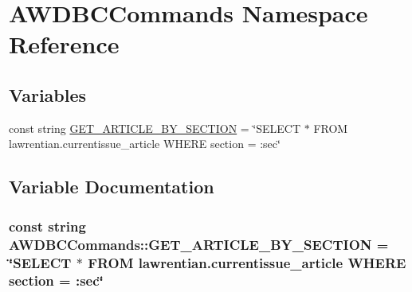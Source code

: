 \hypertarget{namespace_a_w_d_b_c_commands}{}\section{A\+W\+D\+B\+C\+Commands Namespace Reference}
\label{namespace_a_w_d_b_c_commands}
\subsection*{Variables}
\begin{DoxyCompactItemize}
\item 
const string \hyperlink{namespace_a_w_d_b_c_commands_a9ef470fbea57863df7dc89da244e8050}{G\+E\+T\+\_\+\+A\+R\+T\+I\+C\+L\+E\+\_\+\+B\+Y\+\_\+\+S\+E\+C\+T\+I\+O\+N} = \char`\"{}S\+E\+L\+E\+C\+T $\ast$ F\+R\+O\+M lawrentian.\+currentissue\+\_\+article W\+H\+E\+R\+E section = \+:sec\char`\"{}
\end{DoxyCompactItemize}


\subsection{Variable Documentation}
\hypertarget{namespace_a_w_d_b_c_commands_a9ef470fbea57863df7dc89da244e8050}{}
\subsubsection[{G\+E\+T\+\_\+\+A\+R\+T\+I\+C\+L\+E\+\_\+\+B\+Y\+\_\+\+S\+E\+C\+T\+I\+O\+N}]{\setlength{\rightskip}{0pt plus 5cm}const string A\+W\+D\+B\+C\+Commands\+::\+G\+E\+T\+\_\+\+A\+R\+T\+I\+C\+L\+E\+\_\+\+B\+Y\+\_\+\+S\+E\+C\+T\+I\+O\+N = \char`\"{}S\+E\+L\+E\+C\+T $\ast$ F\+R\+O\+M lawrentian.\+currentissue\+\_\+article W\+H\+E\+R\+E section = \+:sec\char`\"{}}\label{namespace_a_w_d_b_c_commands_a9ef470fbea57863df7dc89da244e8050}
